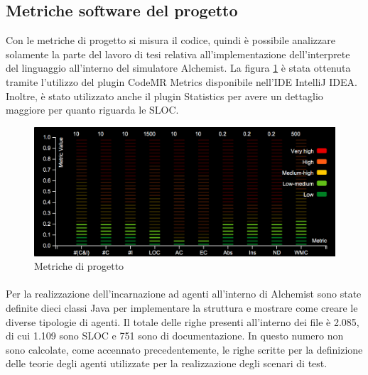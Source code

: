 \subsection{Metriche software del progetto}
Con le metriche di progetto si misura il codice, quindi è possibile analizzare solamente la parte del lavoro di tesi relativa all'implementazione dell'interprete del linguaggio all'interno del simulatore Alchemist.
La figura \ref{fig:codeMetrics} è stata ottenuta tramite l'utilizzo del plugin CodeMR Metrics disponibile nell'IDE IntelliJ IDEA. Inoltre, è stato utilizzato anche il plugin Statistics per avere un dettaglio maggiore per quanto riguarda le SLOC.
\begin{figure} %
\begin{center} %
\includegraphics[width=13cm]{images/codeMetrics.png} %
\caption[Metriche di progetto]{Metriche di progetto} \label{fig:codeMetrics}
\end{center}
\end{figure}

\paragraph*{}
Per la realizzazione dell'incarnazione ad agenti all'interno di Alchemist sono state definite dieci classi Java per implementare la struttura e mostrare come creare le diverse tipologie di agenti. Il totale delle righe presenti all'interno dei file è 2.085, di cui 1.109 sono SLOC e 751 sono di documentazione.
In questo numero non sono calcolate, come accennato precedentemente, le righe scritte per la definizione delle teorie degli agenti utilizzate per la realizzazione degli scenari di test.

